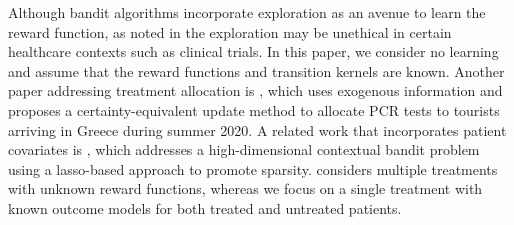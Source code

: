 \documentclass[12pt,a4paper]{article}
\begin{document}
	
	Although bandit algorithms incorporate exploration as an avenue to learn the reward function,  as noted in \cite{bastani2021greedy} the exploration may be unethical in certain healthcare contexts such as clinical trials. %
    In this paper, we consider no learning and assume that the reward functions and transition kernels are known. Another paper addressing treatment allocation is \cite{bastaniCOVID}, which uses exogenous information and proposes a certainty-equivalent update method to allocate PCR tests to tourists arriving in Greece during summer 2020. A related work that incorporates patient covariates is \cite{lassobandit}, which addresses a high-dimensional contextual bandit problem using a lasso-based approach to promote sparsity. \cite{lassobandit} considers multiple treatments with unknown reward functions, whereas we focus on a single treatment with known outcome models for both treated and untreated patients.
\end{document}
